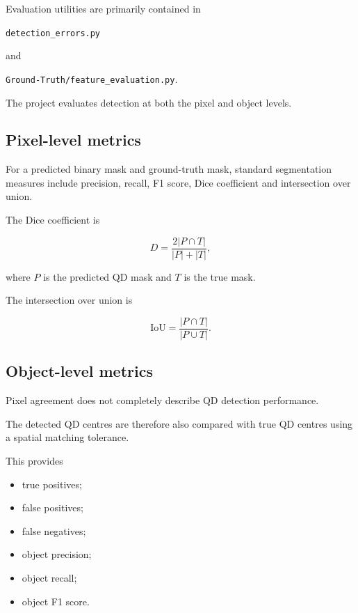 \documentclass[11pt,a4paper]{article}
\begin{document}
Evaluation utilities are primarily contained in

\begin{center}
\texttt{detection\_errors.py}
\end{center}

and

\begin{center}
\texttt{Ground-Truth/feature\_evaluation.py}.
\end{center}

The project evaluates detection at both the pixel and object levels.


\subsection{Pixel-level metrics}

For a predicted binary mask and ground-truth mask, standard segmentation measures include precision, recall, F1 score, Dice coefficient and intersection over union.

The Dice coefficient is

\[
D =
\frac{2|P\cap T|}
{|P|+|T|},
\]

where \(P\) is the predicted QD mask and \(T\) is the true mask.

The intersection over union is

\[
\mathrm{IoU}
=
\frac{|P\cap T|}
{|P\cup T|}.
\]


\subsection{Object-level metrics}

Pixel agreement does not completely describe QD detection performance.

The detected QD centres are therefore also compared with true QD centres using a spatial matching tolerance.

This provides

\begin{itemize}[itemsep=2pt]
    \item true positives;
    \item false positives;
    \item false negatives;
    \item object precision;
    \item object recall;
    \item object F1 score.
\end{itemize}
\end{document}
